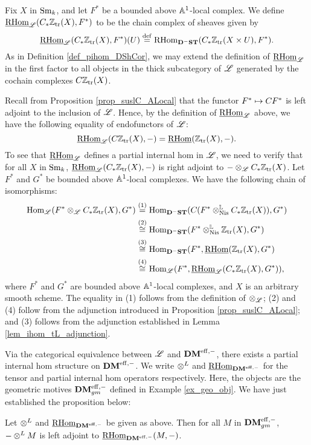 \begin{defn}
Fix $X$ in $\Sm$, and let $F^*$ be a bounded above $\A^1$-local 
complex. We define $\ihomAL(\suslC\Ztr(X), F^*)$ to be the chain
complex of sheaves given by
\[
\ihomAL(\suslC \Ztr(X), F^*)(U) \defeq \rhom_{\DShCor}(\suslC 
   \Ztr(X \times U), F^*).
\]
As in Definition \ref{def_pihom_DShCor}, we may extend the 
definition of $\ihomAL$ in the first factor to all objects in the thick 
subcategory of $\ALocal$ generated by the cochain complexes 
$\suslC[]\Ztr(X)$.
\end{defn}
Recall from Proposition \ref{prop_suslC_ALocal} that the functor
$F^* \mapsto \suslC[] F^*$ is left adjoint to the inclusion of
$\ALocal$. Hence, by the definition of $\ihomAL$ above, we have
the following equality of endofunctors of $\ALocal$:
\[
\ihomAL(\suslC[]\Ztr(X), -) = \sheaf{\rhom}(\Ztr(X), -).
\]
To see that $\ihomAL$ defines a partial internal hom in 
$\ALocal$, we need to verify that for all $X$ in $\Sm$,
$\ihomAL(\suslC \Ztr(X), -)$ is right adjoint to
$-\tAL \suslC \Ztr(X)$. Let $F^*$ and $G^*$ be bounded above 
$\A^1$-local complexes. We have the following chain of 
isomorphisms:
\begin{align*}
\hom_{\ALocal}(F^* \tAL \suslC \Ztr(X), G^*) &\stackrel{(1)}{=}
\hom_{\DShCor}(\suslC[](F^* \tLNis \suslC \Ztr(X)), G^*) \\ 
&\stackrel{(2)}{\cong} \hom_{\DShCor}(F^* \tLNis \Ztr(X), G^*) \\
&\stackrel{(3)}{\cong} \hom_{\DShCor}(F^*, \sheaf{\rhom}(\Ztr(X), G^*) \\
&\stackrel{(4)}{\cong} \hom_{\ALocal}(F^*, \ihomAL(\suslC \Ztr(X), G^*)),
\end{align*}
where $F^*$ and $G^*$ are bounded above $\A^1$-local complexes, and
$X$ is an arbitrary smooth scheme. The equality in (1) follows from
the definition of $\tAL$; (2) and (4) follow from the adjunction
introduced in Proposition \ref{prop_suslC_ALocal}; and (3) follows
from the adjunction established in Lemma \ref{lem_ihom_tL_adjunction}.

Via the categorical equivalence between $\ALocal$ and $\DMeff$, there
exists a partial internal hom structure on $\DMeff$.  We write $\tDM$
and $\ihomDMf$ for the tensor and partial internal hom operators
respectively. Here, the \SemiInvertible objects are the geometric
motives $\DMeffgm$ defined in Example \ref{ex_geo_obj}. We have just
established the proposition below:

\begin{prop}\label{prop_DMgm_monoidal}
Let $\tDM$ and $\ihomDMf$ be given as above. Then for all
$M$ in $\DMeffgm$, $- \tDM M$ is left adjoint to $\ihomDMf(M, -)$.
\end{prop}

